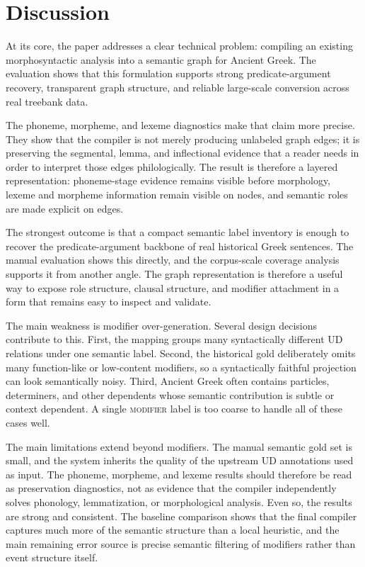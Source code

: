 \documentclass[11pt]{article}
\begin{document}
\section{Discussion}
At its core, the paper addresses a clear technical problem: compiling an existing
morphosyntactic analysis into a semantic graph for Ancient Greek. The evaluation
shows that this formulation supports strong predicate-argument recovery,
transparent graph structure, and reliable large-scale conversion across real
treebank data.

The phoneme, morpheme, and lexeme diagnostics make that claim more precise. They
show that the compiler is not merely producing unlabeled graph edges; it is
preserving the segmental, lemma, and inflectional evidence that a reader needs
in order to interpret those edges philologically. The result is therefore a
layered representation: phoneme-stage evidence remains visible before
morphology, lexeme and morpheme information remain visible on nodes, and
semantic roles are made explicit on edges.

The strongest outcome is that a compact semantic label inventory is enough to
recover the predicate-argument backbone of real historical Greek sentences. The
manual evaluation shows this directly, and the corpus-scale coverage analysis
supports it from another angle. The graph representation is therefore a useful
way to expose role structure, clausal structure, and modifier attachment in a
form that remains easy to inspect and validate.

The main weakness is modifier over-generation. Several design decisions
contribute to this. First, the mapping groups many syntactically different UD
relations under one semantic label. Second, the historical gold deliberately
omits many function-like or low-content modifiers, so a syntactically faithful
projection can look semantically noisy. Third, Ancient Greek often contains
particles, determiners, and other dependents whose semantic contribution is
subtle or context dependent. A single \textsc{modifier} label is too coarse to
handle all of these cases well.

The main limitations extend beyond modifiers. The manual semantic
gold set is small, and the system inherits the quality of the upstream UD
annotations used as input. The phoneme, morpheme, and lexeme results should
therefore be read as preservation diagnostics, not as evidence that the compiler
independently solves phonology, lemmatization, or morphological analysis. Even
so, the results are strong and consistent. The
baseline comparison shows that the final compiler captures much more of the
semantic structure than a local heuristic, and the main remaining error source
is precise semantic filtering of modifiers rather than event structure itself.
\end{document}
